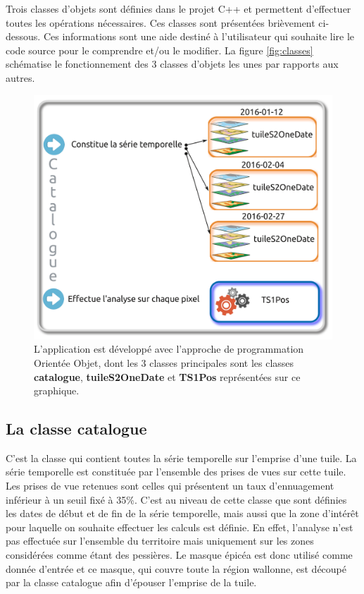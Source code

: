 \documentclass[a4paper, 12pt]{article} %
\begin{document}
Trois classes d'objets sont définies dans le projet C++ et permettent d'effectuer toutes les opérations nécessaires. Ces classes sont présentées brièvement ci-dessous. Ces informations sont une aide destiné à l'utilisateur qui souhaite lire le code source pour le comprendre et/ou le modifier. La figure \ref{fig:classes} schématise le fonctionnement des 3 classes d'objets les unes par rapports aux autres.

\begin{figure}
	\centering
	\includegraphics[width=\linewidth]{illuAppliS2TS.png}
	\caption{L'application est développé avec l'approche de programmation Orientée Objet, dont les 3 classes principales sont les classes \textbf{catalogue}, \textbf{tuileS2OneDate} et \textbf{TS1Pos} représentées sur ce graphique.\textbf{}}
	\label{fig:ex}
\end{figure}




\subsection{La classe \textbf{catalogue}}

C'est la classe qui contient toutes la série temporelle sur l'emprise d'une tuile. La série temporelle est constituée par l'ensemble des prises de vues sur cette tuile. Les prises de vue retenues sont celles qui présentent un taux d'ennuagement inférieur à un seuil fixé à 35\%. C'est au niveau de cette classe que sont définies les dates de début et de fin de la série temporelle, mais aussi que la zone d'intérêt pour laquelle on souhaite effectuer les calculs est définie. En effet, l'analyse n'est pas effectuée sur l'ensemble du territoire mais uniquement sur les zones considérées comme étant des pessières. Le masque épicéa est donc utilisé comme donnée d'entrée et ce masque, qui couvre toute la région wallonne, est découpé par la classe catalogue afin d'épouser l'emprise de la tuile.
\end{document}

